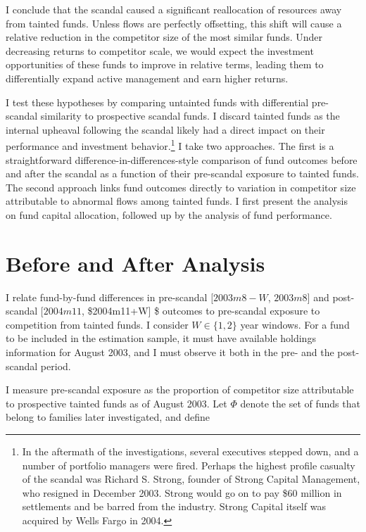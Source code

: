 \documentclass[openany]{book}
\let\rmarkdownfootnote\footnote%
\def\footnote{\protect\rmarkdownfootnote}
\theoremstyle{definition}
\theoremstyle{definition}
\theoremstyle{definition}
\theoremstyle{remark}
\begin{document}
I conclude that the scandal caused a significant reallocation of
resources away from tainted funds. Unless flows are perfectly
offsetting, this shift will cause a relative reduction in the competitor
size of the most similar funds. Under decreasing returns to competitor
scale, we would expect the investment opportunities of these funds to
improve in relative terms, leading them to differentially expand active
management and earn higher returns.

I test these hypotheses by comparing untainted funds with differential
pre-scandal similarity to prospective scandal funds. I discard tainted
funds as the internal upheaval following the scandal likely had a direct
impact on their performance and investment behavior.\footnote{In the
  aftermath of the investigations, several executives stepped down, and
  a number of portfolio managers were fired. Perhaps the highest profile
  casualty of the scandal was Richard S. Strong, founder of Strong
  Capital Management, who resigned in December 2003. Strong would go on
  to pay \$60 million in settlements and be barred from the industry.
  Strong Capital itself was acquired by Wells Fargo in 2004.} I take two
approaches. The first is a straightforward
difference-in-differences-style comparison of fund outcomes before and
after the scandal as a function of their pre-scandal exposure to tainted
funds. The second approach links fund outcomes directly to variation in
competitor size attributable to abnormal flows among tainted funds. I
first present the analysis on fund capital allocation, followed up by
the analysis of fund performance.

\section{Before and After Analysis}\label{sec:scandalID}

I relate fund-by-fund differences in pre-scandal \([2003m8-W\),
\(2003m8]\) and post-scandal \([2004m11\), \$2004m11+W{]} \$ outcomes to
pre-scandal exposure to competition from tainted funds. I consider
\(W\in\{1,2\}\) year windows. For a fund to be included in the
estimation sample, it must have available holdings information for
August 2003, and I must observe it both in the pre- and the post-scandal
period.

I measure pre-scandal exposure as the proportion of competitor size
attributable to prospective tainted funds as of August 2003. Let
\(\Phi\) denote the set of funds that belong to families later
investigated, and define
\end{document}
